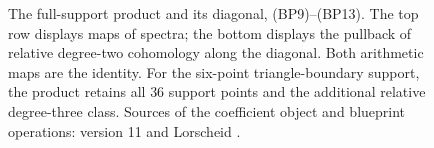 \begin{figure}[ht]
\centering
{}
\caption{The full-support product and its diagonal, (BP9)--(BP13).
The top row displays maps of spectra; the bottom displays the pullback
of relative degree-two cohomology along the diagonal. Both arithmetic
maps are the identity. For the six-point triangle-boundary support,
the product retains all $36$ support points and the additional relative
degree-three class. Sources of the coefficient object and blueprint
operations: version 11 \cite{support} and Lorscheid \cite{lorscheid}.}
\end{figure}
